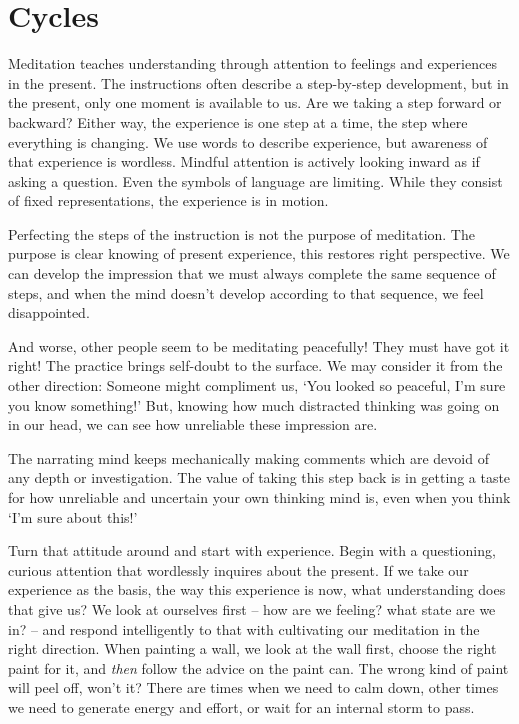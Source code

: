 \chapter{Cycles}


Meditation teaches understanding through attention to feelings and
experiences in the present. The instructions often describe a
step-by-step development, but in the present, only one moment is
available to us. Are we taking a step forward or backward? Either way,
the experience is one step at a time, the step where everything is
changing. We use words to describe experience, but awareness of that
experience is wordless. Mindful attention is actively looking inward as
if asking a question. Even the symbols of language are limiting. While
they consist of fixed representations, the experience is in motion.

Perfecting the steps of the instruction is not the purpose of
meditation. The purpose is clear knowing of present experience, this
restores right perspective. We can develop the impression that we must
always complete the same sequence of steps, and when the mind doesn't
develop according to that sequence, we feel disappointed.


And worse, other people seem to be meditating peacefully! They must have
got it right! The practice brings self-doubt to the surface. We may
consider it from the other direction: Someone might compliment us, `You
looked so peaceful, I'm sure you know something!' But, knowing how much
distracted thinking was going on in our head, we can see how unreliable
these impression are.

\clearpage

The narrating mind keeps mechanically making comments which are devoid
of any depth or investigation. The value of taking this step back is in
getting a taste for how unreliable and uncertain your own thinking mind
is, even when you think `I'm sure about this!'

Turn that attitude around and start with experience. Begin with a
questioning, curious attention that wordlessly inquires about the
present. If we take our experience as the basis, the way this experience
is now, what understanding does that give us? We look at ourselves first
-- how are we feeling? what state are we in? -- and respond
intelligently to that with cultivating our meditation in the right
direction. When painting a wall, we look at the wall first, choose the
right paint for it, and \emph{then} follow the advice on the paint can.
The wrong kind of paint will peel off, won't it? There are times when we
need to calm down, other times we need to generate energy and effort, or
wait for an internal storm to pass.


